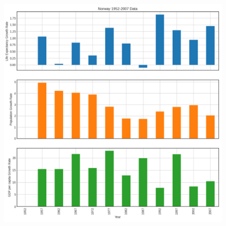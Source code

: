 \documentclass[a4paper,11pt,openright]{report}
\begin{document}
\begin{enumerate}
\begin{figure}[ht!]
\includegraphics[width=30cm,height=15cm,keepaspectratio]{Norway.pdf}
\centering
\end{figure}

\end{enumerate}
\end{document}
